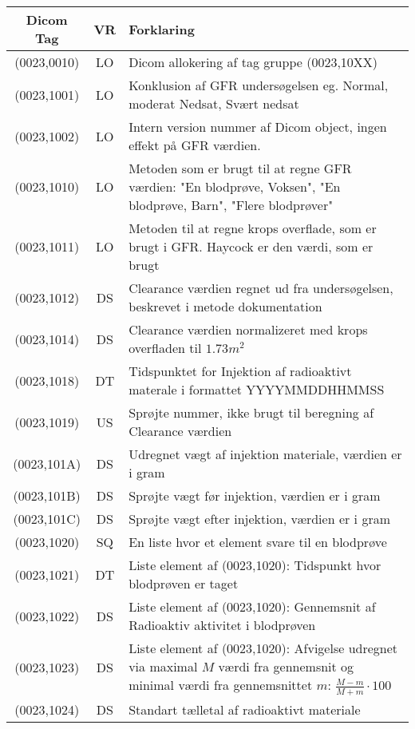 \documentclass{article}
\begin{document}
\begin{table}[h]
	\begin{center}
		\begin{tabular}{|c|c|p{7cm}|}\hline
		Dicom Tag   & VR &  Forklaring \\ \hline
		(0023,0010) & LO &  Dicom allokering af tag gruppe (0023,10XX) \\ \hline
		(0023,1001) & LO & Konklusion af GFR undersøgelsen eg. Normal, moderat Nedsat, Svært nedsat \\ \hline 
		(0023,1002) & LO & Intern version nummer af Dicom object, ingen effekt på GFR værdien. \\ \hline
		(0023,1010) & LO & Metoden som er brugt til at regne GFR værdien: "En blodprøve, Voksen", "En blodprøve, Barn", "Flere blodprøver" \\ \hline
		(0023,1011) & LO & Metoden til at regne krops overflade, som er brugt i GFR. Haycock er den værdi, som er brugt\\ \hline
		(0023,1012) & DS & Clearance værdien regnet ud fra undersøgelsen, beskrevet i metode dokumentation\\ \hline
		(0023,1014) & DS & Clearance værdien normalizeret med krops overfladen til $1.73m^2$ \\ \hline
		(0023,1018) & DT & Tidspunktet for Injektion af radioaktivt materale i formattet YYYYMMDDHHMMSS \\ \hline
		(0023,1019) & US & Sprøjte nummer, ikke brugt til beregning af Clearance værdien \\ \hline
		(0023,101A) & DS & Udregnet vægt af injektion materiale, værdien er i gram \\ \hline
		(0023,101B) & DS & Sprøjte vægt før injektion, værdien er i gram  \\ \hline
		(0023,101C) & DS & Sprøjte vægt efter injektion, værdien er i gram  \\ \hline
		(0023,1020) & SQ & En liste hvor et element svare til en blodprøve \\ \hline
		(0023,1021) & DT & Liste element af (0023,1020): Tidspunkt hvor blodprøven er taget \\ \hline
		(0023,1022) & DS & Liste element af (0023,1020): Gennemsnit af Radioaktiv aktivitet i blodprøven \\\hline
		(0023,1023) & DS & Liste element af (0023,1020): Afvigelse udregnet via  maximal $M$ værdi fra gennemsnit og minimal værdi fra gennemsnittet $m$: $\frac{M-m}{M+m} \cdot 100$ \\ \hline
		(0023,1024) & DS & Standart tælletal af radioaktivt materiale \\ \hline

\end{tabular}
\end{center}
\end{table}
\end{document}
